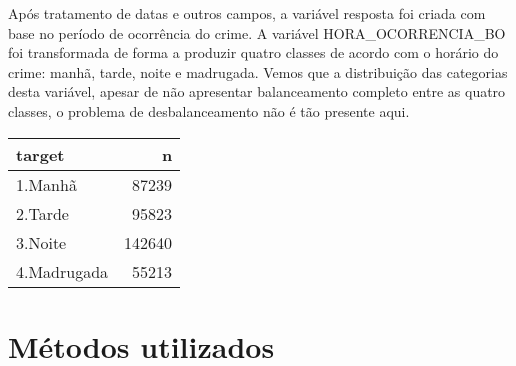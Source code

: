 \documentclass[
  12pt,
  portuguese,
]{report}
\newenvironment{Shaded}{\begin{snugshade}}{\end{snugshade}}
\newcommand{\AttributeTok}[1]{\textcolor[rgb]{0.77,0.63,0.00}{#1}}
\newcommand{\DecValTok}[1]{\textcolor[rgb]{0.00,0.00,0.81}{#1}}
\newcommand{\FunctionTok}[1]{\textcolor[rgb]{0.00,0.00,0.00}{#1}}
\newcommand{\NormalTok}[1]{#1}
\newcommand{\OtherTok}[1]{\textcolor[rgb]{0.56,0.35,0.01}{#1}}
\newcommand{\SpecialCharTok}[1]{\textcolor[rgb]{0.00,0.00,0.00}{#1}}
\newcommand{\StringTok}[1]{\textcolor[rgb]{0.31,0.60,0.02}{#1}}
\begin{document}
\begin{Shaded}
\end{Shaded}

Após tratamento de datas e outros campos, a variável resposta foi criada com base no período de ocorrência do crime. A variável HORA\_OCORRENCIA\_BO foi transformada de forma a produzir quatro classes de acordo com o horário do crime: manhã, tarde, noite e madrugada. Vemos que a distribuição das categorias desta variável, apesar de não apresentar balanceamento completo entre as quatro classes, o problema de desbalanceamento não é tão presente aqui.

\begin{tabular}{l|r}
\hline
target & n\\
\hline
1.Manhã & 87239\\
\hline
2.Tarde & 95823\\
\hline
3.Noite & 142640\\
\hline
4.Madrugada & 55213\\
\hline
\end{tabular}

\hypertarget{muxe9todos-utilizados}{%
\section{Métodos utilizados}\label{muxe9todos-utilizados}}
\end{document}

